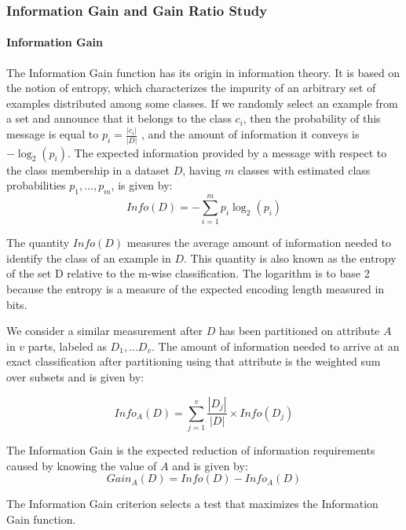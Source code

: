 \subsubsection{Information Gain and Gain Ratio Study}
\label{section:InformationGainAndGainRatioStudy}
\paragraph{Information Gain}
The Information Gain function has its origin in information theory. It is based on the notion of entropy, which characterizes the impurity of an arbitrary set of examples distributed among some classes. If we randomly select an example from a set and announce that it belongs to the class $c_i$, then the probability of this message is equal to $p_i = \frac{|c_i|}{|D|}$ , and the amount of information it conveys is $-\log_2(p_i)$. The expected information provided by a message with respect to the class membership in a dataset $D$, having $m$ classes with estimated class probabilities $p_1,\ldots,p_m$, is given by:
\begin{equation}
Info(D) = -\sum_{i=1}^{m} p_i \log_2(p_i)
\end{equation}

The quantity $Info(D)$ measures the average amount of information needed to identify the class of an example in $D$. This quantity is also known as the entropy of the set D relative to the m-wise classification. The logarithm is to base 2 because the entropy is a measure of the expected encoding length measured in bits.

We consider a similar measurement after $D$ has been partitioned on attribute $A$ in $v$ parts, labeled as $D_1,\ldots D_v$. The amount of information needed to arrive at an exact classification after partitioning using that attribute is the weighted sum over subsets and is given by:

\begin{equation}
Info_A(D) = \sum_{j=1}^v \frac{|D_j|}{|D|} \times Info(D_j)
\end{equation}

The Information Gain is the expected reduction of information requirements caused by knowing the value of $A$ and is given by:
\begin{equation}
Gain_A(D) = Info(D) - Info_A(D)
\end{equation}

The Information Gain criterion selects a test that maximizes the Information Gain function. 

